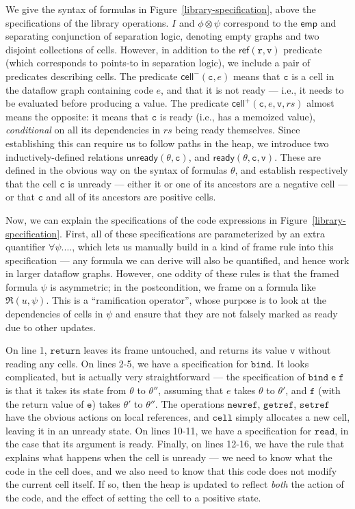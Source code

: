 \documentclass[nocopyrightspace,preprint]{sigplanconf}
\newcommand{\ready}[3]{\mathsf{ready}({#1}, {#2}, {#3})}
\newcommand{\unready}[2]{\mathsf{unready}({#1}, {#2})}
\newcommand{\term}[1]{\ensuremath{\mathtt{{#1}}}}
\newcommand{\cellminus}[2]{\mathsf{cell}^{-}({#1}, {#2})}
\newcommand{\cellplus}[4]{\mathsf{cell}^{+}({#1}, {#2}, {#3}, {#4})}
\newcommand{\emp}{\mathsf{emp}}
\newcommand{\localref}[2]{\mathsf{ref}\term{(#1, #2)}}
\begin{document}
We give the syntax of formulas in Figure~\ref{library-specification},
above the specifications of the library operations. $I$ and $\phi
\otimes \psi$ correspond to the $\emp$ and separating conjunction of
separation logic, denoting empty graphs and two disjoint collections
of cells. However, in addition to the $\localref{r}{v}$ predicate
(which corresponds to points-to in separation logic), we include a
pair of predicates describing cells. The predicate
$\cellminus{\term{c}}{e}$ means that \term{c} is a cell in the
dataflow graph containing code $e$, and that it is not ready --- i.e.,
it needs to be evaluated before producing a value.  The predicate
$\cellplus{\term{c}}{e}{\term{v}}{rs}$ almost means the opposite: it
means that \term{c} is ready (i.e., has a memoized value),
\emph{conditional} on all its dependencies in $rs$ being ready
themselves.  Since establishing this can require us to follow paths in
the heap, we introduce two inductively-defined relations
$\unready{\theta}{\term{c}}$, and
$\ready{\theta}{\term{c}}{\term{v}}$. These are defined in the obvious
way on the syntax of formulas $\theta$, and establish respectively
that the cell \term{c} is unready --- either it or one of its
ancestors are a negative cell --- or that \term{c} and all of its
ancestors are positive cells.

Now, we can explain the specifications of the code expressions in
Figure~\ref{library-specification}. First, all of these specifications
are parameterized by an extra quantifier $\forall \psi.\ldots$, which
lets us manually build in a kind of frame rule into this specification
--- any formula we can derive will also be quantified, and hence work
in larger dataflow graphs. However, one oddity of these rules is that
the framed formula $\psi$ is asymmetric; in the postcondition, we
frame on a formula like $\Re(u, \psi)$. This is a ``ramification
operator'', whose purpose is to look at the dependencies of cells in
$\psi$ and ensure that they are not falsely marked as ready due to 
other updates. 

On line 1, \term{return} leaves its frame untouched, and returns its
value \term{v} without reading any cells. On lines 2-5, we have a
specification for \term{bind}. It looks complicated, but is actually
very straightforward --- the specification of \term{bind\;e\;f} is
that it takes its state from $\theta$ to $\theta''$, assuming that $e$
takes $\theta$ to $\theta'$, and \term{f} (with the return value of
\term{e}) takes $\theta'$ to $\theta''$. The operations \term{newref},
\term{getref}, \term{setref} have the obvious actions on local
references, and \term{cell} simply allocates a new cell, leaving it
in an unready state. On lines 10-11, we have a specification for 
\term{read}, in the case that its argument is ready. Finally, on
lines 12-16, we have the rule that explains what happens when the
cell is unready --- we need to know what the code in the cell does,
and we also need to know that this code does not modify the current
cell itself. If so, then the heap is updated to reflect \emph{both}
the action of the code, and the effect of setting the cell to a 
positive state. 
\end{document}
